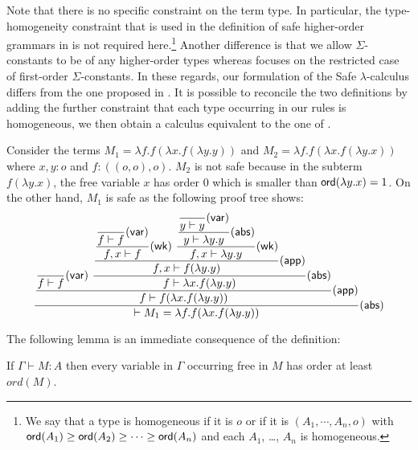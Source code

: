 \documentclass{llncs}
\newcommand\dps{\displaystyle}
\newcommand\rulef[2]{\frac{\dps #1}{#2}}
\newcommand\ord[1]{{\sf ord}(#1)}
\begin{document}
Note that there is no specific constraint on the term type. In particular, the type-homogeneity constraint that is used
in the definition of safe higher-order grammars in \cite{KNU02} is not required here.\footnote{ We say that a type is homogeneous
if it is $o$ or if it is $(A_1, \cdots, A_n, o)$ with $\ord{A_1} \geq \ord{A_2}\geq \cdots \geq \ord{A_n}$ and
each $A_1$, \ldots, $A_n$ is homogeneous.} Another difference is that we allow $\Sigma$-constants to be of any higher-order types whereas
\cite{KNU02} focuses on the restricted case of first-order $\Sigma$-constants.
In these regards, our formulation of the Safe $\lambda$-calculus differs from the one proposed in \cite{safety-mirlong2004}.
It is possible to reconcile the two definitions by adding the further constraint that each type occurring in our rules is homogeneous, we then obtain a calculus equivalent to the one of \cite{safety-mirlong2004}.




\begin{example}
\label{ex:kierstead}
Consider the terms $M_1 = \lambda f . f (\lambda x . f (\lambda y . y ))$ and
$M_2 = \lambda f . f (\lambda x . f (\lambda y .x ))$ where $x,y:o$ and $f:((o,o),o)$.
$M_2$ is not safe because in the subterm $f (\lambda y . x)$, the free variable $x$ has order $0$ which is smaller than $\ord{\lambda y . x} = 1$.
On the other hand, $M_1$ is safe as the following proof tree shows:
$$
 \rulef{
     \rulef{
        \rulef{}{f \vdash f} {\sf(var)}
        \
        \rulef{
             \rulef{
                \rulef{
                    \rulef{}{f \vdash f} {\sf(var)}
                }
                {f , x \vdash f } {\sf(wk)}
                \
                \rulef{
                    \rulef{
                        \rulef{}{y \vdash y} {\sf(var)}
                    }
                    {y \vdash \lambda y . y } {\sf(abs)}
                }
                {f , x \vdash \lambda y .y } {\sf(wk)}
             }
             {f , x \vdash f (\lambda y .y )} {\sf(app)}
        }
        { f  \vdash \lambda x . f (\lambda y .y )} {\sf(abs)}
     }
     {
        f  \vdash f (\lambda x . f (\lambda y .y ))} {\sf(app)}
     }
 { \vdash M_1 = \lambda f . f (\lambda x . f (\lambda y .y )) } {\sf(abs)}
$$
\end{example}

The following lemma is an immediate consequence of the definition:
\begin{lemma}
\label{lem:ordfreevar}
If $\Gamma \vdash M : A$ then every variable in $\Gamma$ occurring free in $M$ has order at least $ord(M)$.
\end{lemma}
\end{document}
